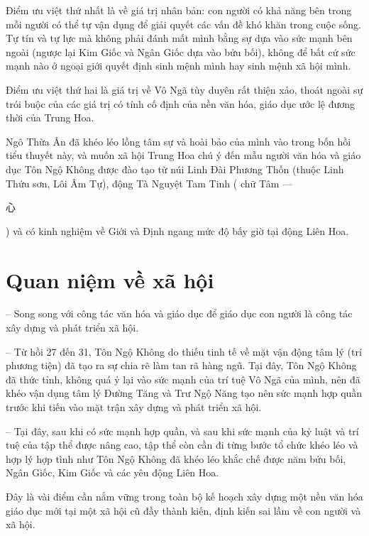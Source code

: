 Điểm ưu việt thứ nhất là về giá trị nhân bản: con người có khả năng bên trong mỗi người có thể tự vận dụng để giải quyết các vấn đề khó khăn trong cuộc sống. Tự tín và tự lực mà không phải đánh mất mình bằng sự dựa vào sức mạnh bên ngoài (ngược lại Kim Giốc và Ngân Giốc dựa vào bửu bối), không để bất cứ sức mạnh nào ở ngoại giới quyết định sinh mệnh mình hay sinh mệnh xã hội mình.

Điểm ưu việt thứ hai là giá trị về Vô Ngã tùy duyên rất thiện xảo, thoát ngoài sự trói buộc của các giá trị có tính cố định của nền văn hóa, giáo dục ước lệ đương thời của Trung Hoa.

Ngô Thừa Ân đã khéo léo lồng tâm sự và hoài bảo của mình vào trong bốn hồi tiểu thuyết này, và muốn xã hội Trung Hoa chú ý đến mẫu người văn hóa và giáo dục Tôn Ngộ Không được đào tạo từ núi Linh Đài Phương Thốn (thuộc Linh Thứu sơn, Lôi Âm Tự), động Tà Nguyệt Tam Tinh ( chữ Tâm --- \begin{CJK*}{UTF8}{gbsn}心 \end{CJK*}) và có kinh nghiệm về Giới và Định ngang mức độ bấy giờ tại động Liên Hoa.

\section{Quan niệm về xã hội} %
\label{sec:33_34_xa_hoi}

-- Song song với công tác văn hóa và giáo dục để giáo dục con người là công tác xây dựng và phát triển xã hội.

-- Từ hồi 27 đến 31, Tôn Ngộ Không do thiếu tinh tế về mặt vận động tâm lý (trí phương tiện) đã tạo ra sự chia rẽ làm tan rã hàng ngũ. Tại đây, Tôn Ngộ Không đã thức tỉnh, không quá ỷ lại vào sức mạnh của trí tuệ Vô Ngã của mình, nên đã khéo vận dụng tâm lý Đường Tăng và Trư Ngộ Năng tạo nên sức mạnh hợp quần trước khi tiến vào mặt trận xây dựng và phát triển xã hội.

-- Tại đây, sau khi có sức mạnh hợp quần, và sau khi sức mạnh của kỷ luật và trí tuệ của tập thể được nâng cao, tập thể còn cần đi từng bước tổ chức khéo léo và hợp lý hợp tình như Tôn Ngộ Không đã khéo léo khắc chế được năm bửu bối, Ngân Giốc, Kim Giốc và các yêu động Liên Hoa.

Đây là vài điểm cần nắm vững trong toàn bộ kế hoạch xây dựng một nền văn hóa giáo dục mới tại một xã hội cũ đầy thành kiến, định kiến sai lầm về con người và xã hội.
